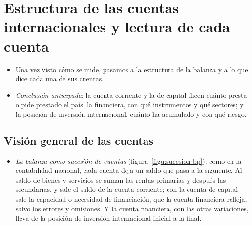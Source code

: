 \documentclass[11pt]{article}
\begin{document}
\section{Estructura de las cuentas internacionales\cortetitulo{} y lectura de cada cuenta}\label{sec:estructura}

\begin{itemize}
\item Una vez visto cómo se mide, pasamos a la estructura de la balanza y a lo que dice cada una de sus cuentas.
\item \emph{Conclusión anticipada}: la cuenta corriente y la de capital dicen cuánto presta o pide prestado el país; la financiera, con qué instrumentos y qué sectores; y la posición de inversión internacional, cuánto ha acumulado y con qué riesgo.
\end{itemize}

\subsection{Visión general de las cuentas}\label{sec:vision-general}

\begin{itemize}
\item \emph{La balanza como sucesión de cuentas} (figura~\ref{figu:sucesion-bp}): como en la contabilidad nacional, cada cuenta deja un saldo que pasa a la siguiente. Al saldo de bienes y servicios se suman las rentas primarias y después las secundarias, y sale el saldo de la cuenta corriente; con la cuenta de capital sale la capacidad o necesidad de financiación, que la cuenta financiera refleja, salvo los errores y omisiones. Y la cuenta financiera, con las otras variaciones, lleva de la posición de inversión internacional inicial a la final.
\end{itemize}

\begin{infografia}[H]
\centering
\caption{La balanza de pagos como sucesión de cuentas, de la posición inicial a la final}\label{figu:sucesion-bp}
\end{infografia}
\end{document}
